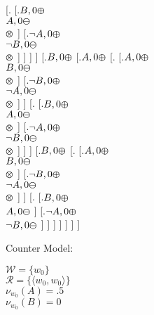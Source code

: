 \documentclass{article}
\begin{document}
[.{} [.{$B, 0\varoplus $ \\ $A, 0\varominus $ \\ $ \varotimes  $}  ] 
[.{$\neg A, 0\varoplus $ \\ $\neg B, 0\varominus $ \\ $ \varotimes  $}  ]  ]  ]  ] 
[.{$B, 0\varoplus $} [.{$A, 0\varoplus $} [.{} [.{$A, 0\varoplus $ \\ $B, 0\varominus $ \\ $ \varotimes  $}  ] 
[.{$\neg B, 0\varoplus $ \\ $\neg A, 0\varominus $ \\ $ \varotimes  $}  ]  ] 
[.{} [.{$B, 0\varoplus $ \\ $A, 0\varominus $ \\ $ \varotimes  $}  ] 
[.{$\neg A, 0\varoplus $ \\ $\neg B, 0\varominus $ \\ $ \varotimes  $}  ]  ]  ] 
[.{$B, 0\varoplus $} [.{} [.{$A, 0\varoplus $ \\ $B, 0\varominus $ \\ $ \varotimes  $}  ] 
[.{$\neg B, 0\varoplus $ \\ $\neg A, 0\varominus $ \\ $ \varotimes  $}  ]  ] 
[.{} [.{$B, 0\varoplus $ \\ $A, 0\varominus $}  ] 
[.{$\neg A, 0\varoplus $ \\ $\neg B, 0\varominus $}  ]  ]  ]  ]  ]  ]  ]\bigskip

Counter Model: 

\bigskip
\noindent $\mathcal{W} = \{ w_0\} $\\
$\mathcal{R} = \{ \langle w_0,w_0 \rangle \} $\\
$ \mathcal{\nu}_{w_0}(A)=.5 $ \\
$ \mathcal{\nu}_{w_0}(B)=0 $ \\
\bigskip




 
\end{document}
